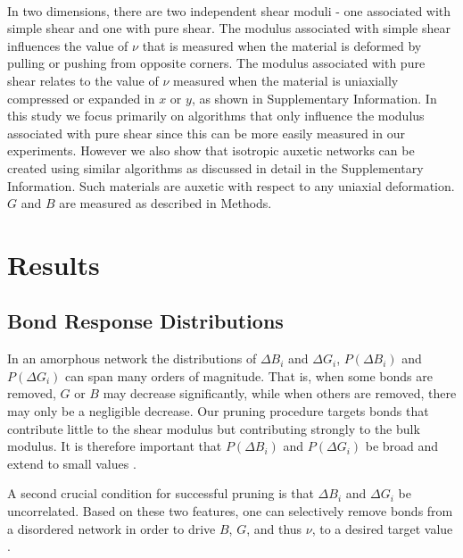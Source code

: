 \documentclass[9pt,twocolumn,twoside]{pnas-new}
\begin{document}
\paragraph{}
In two dimensions, there are two independent shear moduli - one associated with simple shear and one with pure shear.  The modulus associated with simple shear influences the value of $\nu$ that is measured when the material is deformed by pulling or pushing from opposite corners. The modulus associated with pure shear relates to the value of $\nu$ measured when the material is uniaxially compressed or expanded in $x$ or $y$, as shown in Supplementary Information.  In this study we focus primarily on algorithms that only influence the modulus associated with pure shear since this can be more easily measured in our experiments.  However we also show that isotropic auxetic networks can be created using similar algorithms as discussed in detail in the Supplementary Information.  Such materials are auxetic with respect to any uniaxial deformation. $G$ and $B$ are measured as described in Methods.
\paragraph{}


\section*{Results}
\subsection*{Bond Response Distributions}
In an amorphous network the distributions of $\Delta B_{i}$ and $\Delta G_{i}$, $P(\Delta B_{i})$ and $P(\Delta G_{i})$ can span many orders of magnitude.  That is, when some bonds are removed, $G$ or $B$ may decrease significantly, while when others are removed, there may only be a negligible decrease.  Our pruning procedure targets bonds that contribute little to the shear modulus but contributing strongly to the bulk modulus. It is therefore important that $P(\Delta B_{i})$ and $P(\Delta G_{i})$ be broad and extend to small values \cite{goodrich2015principle, hexner2017linking}.

A second crucial condition for successful pruning is that $\Delta B_{i}$ and $\Delta G_{i}$ be uncorrelated.  Based on these two features, one can selectively remove bonds from a disordered network in order to drive $B$, $G$, and thus $\nu$, to a desired target value \cite{goodrich2015principle, hexner2017role}.
\end{document}
